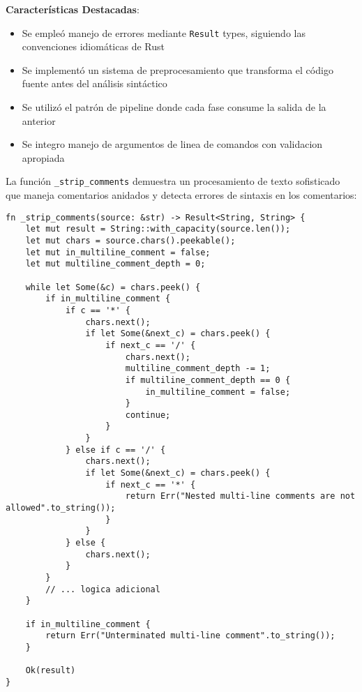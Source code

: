 \documentclass[12pt,a4paper]{article}
\begin{document}
\textbf{Características Destacadas}:
\begin{itemize}
    \item Se empleó manejo de errores mediante \texttt{Result} types, siguiendo las convenciones idiomáticas de Rust
    \item Se implementó un sistema de preprocesamiento que transforma el código fuente antes del análisis sintáctico
    \item Se utilizó el patrón de pipeline donde cada fase consume la salida de la anterior
    \item Se integro manejo de argumentos de linea de comandos con validacion apropiada
\end{itemize}

La función \texttt{\_strip\_comments} demuestra un procesamiento de texto sofisticado que maneja comentarios anidados y detecta errores de sintaxis en los comentarios:

\begin{lstlisting}[style=rustcode,caption=Procesamiento avanzado de comentarios]
fn _strip_comments(source: &str) -> Result<String, String> {
    let mut result = String::with_capacity(source.len());
    let mut chars = source.chars().peekable();
    let mut in_multiline_comment = false;
    let mut multiline_comment_depth = 0;

    while let Some(&c) = chars.peek() {
        if in_multiline_comment {
            if c == '*' {
                chars.next();
                if let Some(&next_c) = chars.peek() {
                    if next_c == '/' {
                        chars.next();
                        multiline_comment_depth -= 1;
                        if multiline_comment_depth == 0 {
                            in_multiline_comment = false;
                        }
                        continue;
                    }
                }
            } else if c == '/' {
                chars.next();
                if let Some(&next_c) = chars.peek() {
                    if next_c == '*' {
                        return Err("Nested multi-line comments are not allowed".to_string());
                    }
                }
            } else {
                chars.next();
            }
        }
        // ... logica adicional
    }
    
    if in_multiline_comment {
        return Err("Unterminated multi-line comment".to_string());
    }
    
    Ok(result)
}
\end{lstlisting}
\end{document}
